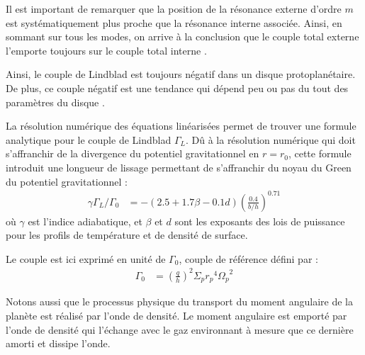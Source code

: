 \bigskip

Il est important de remarquer que la position de la résonance externe d'ordre $m$ est systématiquement plus proche que la résonance interne associée. Ainsi, en sommant sur tous les modes, on arrive à la conclusion que le couple total externe l'emporte toujours sur le couple total interne \citep{ward1997protoplanet}. 

Ainsi, le couple de Lindblad est toujours négatif dans un disque protoplanétaire. De plus, ce couple négatif est une tendance qui dépend peu ou pas du tout des paramètres du disque \citep{ward1997protoplanet}.

La résolution numérique des équations linéarisées permet de trouver une formule analytique pour le couple de Lindblad $\Gamma_L$. Dû à la résolution numérique qui doit s'affranchir de la divergence du potentiel gravitationnel en $r=r_0$, cette formule introduit une longueur de lissage permettant de s'affranchir du noyau du Green du potentiel gravitationnel \citep[eq. (14)]{paardekooper2010torque} : 
\begin{align}
\gamma \Gamma_L/\Gamma_0 &= - \left(2.5 +1.7\beta -0.1d\right) \left(\frac{0.4}{b/h}\right)^{0.71}
\end{align}
où $\gamma$ est l'indice adiabatique, et $\beta$ et $d$ sont les exposants des lois de puissance pour les profils de température et de densité de surface. 

Le couple est ici exprimé en unité de $\Gamma_0$, couple de référence défini par : 
\begin{align}
\Gamma_0 &= \left(\frac{q}{h}\right)^2\Sigma_p {r_p}^4 {\Omega_p}^2
\end{align}

Notons aussi que le processus physique du transport du moment angulaire de la planète est réalisé par l'onde de densité. Le moment angulaire est emporté par l'onde de densité qui l'échange avec le gaz environnant à mesure que ce dernière amorti et dissipe l'onde.

